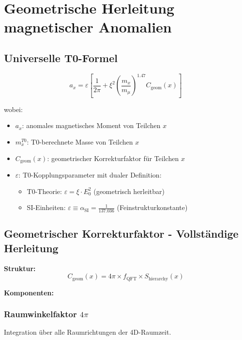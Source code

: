 \documentclass[12pt,a4paper]{article}
\numberwithin{equation}{section}
\newcommand{\xipar}{\xi}
\newcommand{\epsilonT}{\varepsilon}
\newcommand{\alphaSI}{\alpha_{\text{SI}}}
\newcommand{\Cgeom}{C_{\text{geom}}}
\newcommand{\fQFT}{f_{\text{QFT}}}
\newcommand{\Eo}{E_0}
\begin{document}
	\section{Geometrische Herleitung magnetischer Anomalien}
	
	\subsection{Universelle T0-Formel}
	
	\begin{equation}
		a_x = \epsilonT \left[ \frac{1}{2\pi} + \xipar^2 \left(\frac{m_x}{m_\mu}\right)^{1.47} \Cgeom(x) \right]
		\label{eq:universal_formula}
	\end{equation}
	
	wobei:
	\begin{itemize}
		\item $a_x$: anomales magnetisches Moment von Teilchen $x$
		\item $m_x^{T0}$: T0-berechnete Masse von Teilchen $x$
		\item $\Cgeom(x)$: geometrischer Korrekturfaktor für Teilchen $x$
		\item $\epsilonT$: T0-Kopplungsparameter mit dualer Definition:
		\begin{itemize}
			\item T0-Theorie: $\epsilonT = \xipar \cdot \Eo^2$ (geometrisch herleitbar)
			\item SI-Einheiten: $\epsilonT \equiv \alphaSI = \frac{1}{137.036}$ (Feinstrukturkonstante)
		\end{itemize}
	\end{itemize}
	
	\subsection{Geometrischer Korrekturfaktor - Vollständige Herleitung}
	
	\textbf{Struktur:}
	\begin{equation}
		\Cgeom(x) = 4\pi \times \fQFT \times S_{\text{hierarchy}}(x)
		\label{eq:cgeom_structure}
	\end{equation}
	
	\textbf{Komponenten:}
	
	\subsubsection{Raumwinkelfaktor $4\pi$}
	Integration über alle Raumrichtungen der 4D-Raumzeit.
	
\end{document}

